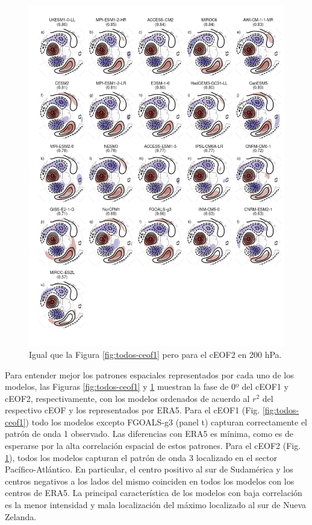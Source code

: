 \documentclass[12pt,oneside,a4paper]{reedthesis}
\begin{document}
\begin{figure}

{\centering \includegraphics{figures/50-cmip6/todos-ceof2-1} 

}

\caption{Igual que la Figura \ref{fig:todos-ceof1} pero para el cEOF2 en 200 hPa.}\label{fig:todos-ceof2}
\end{figure}



Para entender mejor los patrones espaciales representados por cada uno de los modelos, las Figuras \ref{fig:todos-ceof1} y \ref{fig:todos-ceof2} muestran la fase de 0º del cEOF1 y cEOF2, respectivamente, con los modelos ordenados de acuerdo al \(r^2\) del respectivo cEOF y los representados por ERA5.
Para el cEOF1 (Fig. \ref{fig:todos-ceof1}) todo los modelos excepto FGOALS-g3 (panel t) capturan correctamente el patrón de onda 1 observado.
Las diferencias con ERA5 es mínima, como es de esperarse por la alta correlación espacial de estos patrones.
Para el cEOF2 (Fig. \ref{fig:todos-ceof2}), todos los modelos capturan el patrón de onda 3 localizado en el sector Pacífico-Atlántico.
En particular, el centro positivo al sur de Sudamérica y los centros negativos a los lados del mismo coinciden en todos los modelos con los centros de ERA5.
La principal característica de los modelos con baja correlación es la menor intensidad y mala localización del máximo localizado al sur de Nueva Zelanda.
\end{document}
